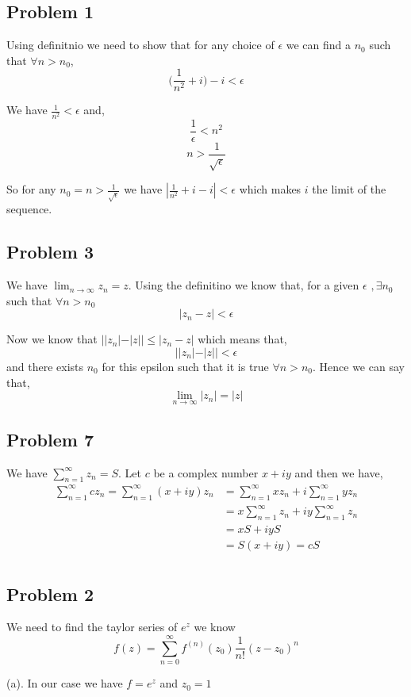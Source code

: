 \documentclass[a4paper]{report}
\begin{document}
\subsection*{Problem 1}
Using definitnio we need to show that for any choice of $\epsilon$ we can find a $n_0$ such that $\forall n > n_0$, 
$$ \bigg (\frac{1}{n^2} + i \bigg)  - i < \epsilon$$ 

We have $\frac{1}{n^2} < \epsilon$ and, 
$$ \frac{1}{\epsilon} < n^2 $$ 
$$ n > \frac{1}{\sqrt{\epsilon}} $$ 

So for any $n_0 = n > \frac{1}{\sqrt{\epsilon}}$ we have  $|\frac{1}{n^2} + i - i| < \epsilon$ which makes $i$ the limit of the sequence.


\subsection*{Problem 3}
We have $\lim_{n \to \infty} z_n =z$. Using the definitino we know that, for a given $\epsilon$ $,\exists n_0$ such that $\forall n > n_0$
$$ |z_n - z| < \epsilon $$  

Now we know that $||z_n| - |z|| \le |z_n - z|$ which  means that,  
$$ ||z_n| - |z|| <  \epsilon $$ and there exists $n_0$ for this epsilon such that it is true  $\forall n > n_0$. Hence we can say that, 
$$ \lim_{n \to \infty} |z_n| = |z| $$ 


\subsection*{Problem 7}
We have  $\sum_{n=1}^{\infty} z_n = S$. Let  $c$ be a complex number $x + iy$ and then we have, 
\begin{align*}
    \sum_{n=1}^{\infty} cz_n = \sum_{n=1}^{\infty} (x+iy)z_n &= \sum_{n=1}^{\infty} xz_n + i \sum_{n=1}^{\infty} yz_n\\
&=  x\sum_{n=1}^{\infty} z_n + i y\sum_{n=1}^{\infty} z_n\\
&= xS + iyS \\
&= S(x+iy) =cS \\
\end{align*}


\subsection*{Problem 2}
We need to find the taylor series of $e^{z}$ we know  
$$ f(z) = \sum_{n=0}^{\infty} f^{(n)}(z_0)\frac{1}{n!} (z-z_0)^{n} $$ 

(a). In our case we have $f = e^{z}$ and $z_0 = 1$
\end{document}
